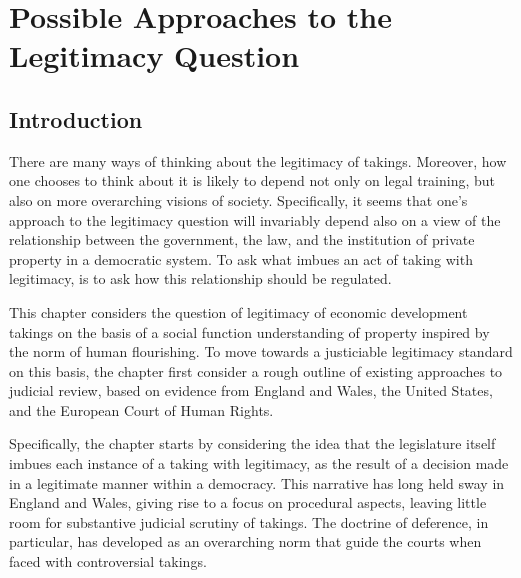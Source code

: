 
\chapter{Possible Approaches to the Legitimacy Question}\label{chap:3}

\section{Introduction}\label{sec:3:1}


There are many ways of thinking about the legitimacy of takings. Moreover, how one chooses to think about it is likely to depend not only on legal training, but also on more overarching visions of society. Specifically, it seems that one's approach to the legitimacy question will invariably depend also on a view of the relationship between the government, the law, and the institution of private property in a democratic system. To ask what imbues an act of taking with legitimacy, is to ask how this relationship should be regulated.

This chapter considers the question of legitimacy of economic development takings on the basis of a social function understanding of property inspired by the norm of human flourishing. To move towards a justiciable legitimacy standard on this basis, the chapter first consider a rough outline of existing approaches to judicial review, based on evidence from England and Wales, the United States, and the European Court of Human Rights.

Specifically, the chapter starts by considering the idea that the legislature itself imbues each instance of a taking with legitimacy, as the result of a decision made in a legitimate manner within a democracy. This narrative has long held sway in England and Wales, giving rise to a focus on procedural aspects, leaving little room for substantive judicial scrutiny of takings. The doctrine of deference, in particular, has developed as an overarching norm that guide the courts when faced with controversial takings. %

